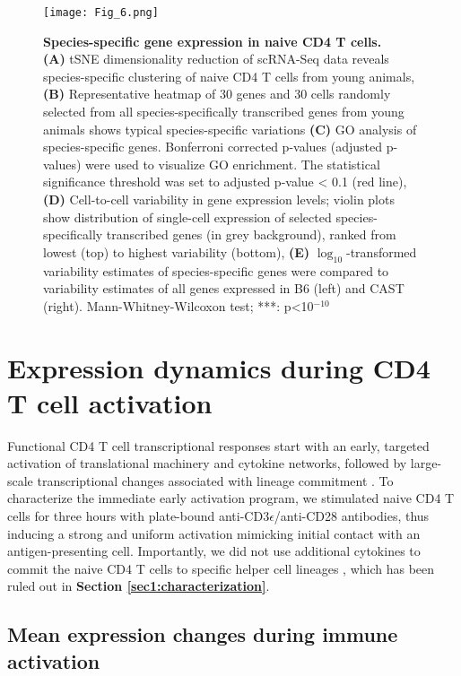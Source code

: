 \begin{figure}[!h]
\centering
\texttt{[image: Fig\_6.png]}
\caption[Species-specific gene expression in naive CD4\plus{} T cells]{\textbf{Species-specific gene expression in naive CD4\plus{} T cells.}\\
\textbf{(A)} tSNE dimensionality reduction of scRNA-Seq data reveals species-specific clustering of naive CD4\plus{} T cells from young animals, \textbf{(B)} Representative heatmap of 30 genes and 30 cells randomly selected from all species-specifically transcribed genes from young animals shows typical species-specific variations \textbf{(C)}  GO analysis of species-specific genes. Bonferroni corrected p-values (adjusted p-values) were used to visualize GO enrichment. The statistical significance threshold was set to adjusted p-value < 0.1 (red line), \textbf{(D)} Cell-to-cell variability in gene expression levels; violin plots show distribution of single-cell expression of selected species-specifically transcribed genes (in grey background), ranked from lowest (top) to highest variability (bottom), \textbf{(E)} $\log_10$-transformed variability estimates of species-specific genes were compared to variability estimates of all genes expressed in B6 (left) and CAST (right). Mann-Whitney-Wilcoxon test; ***: p<10$^{-10}$}
\label{fig1:species_specific}
\end{figure}

\newpage


\section{Expression dynamics during CD4\plus{} T cell activation}

Functional CD4\plus{} T cell transcriptional responses start with an early, targeted activation of translational machinery and cytokine networks, followed by large-scale transcriptional changes associated with lineage commitment \citep{Shay2013, Asmal2003}. To characterize the immediate early activation program, we stimulated naive CD4\plus{} T cells for three hours with plate-bound anti-CD3$\epsilon$/anti-CD28 antibodies, thus inducing a strong and uniform activation mimicking initial contact with an antigen-presenting cell. Importantly, we did not use additional cytokines to commit the naive CD4\plus{} T cells to specific helper cell lineages \citep{Zhu2010}, which has been ruled out in \textbf{Section \ref{sec1:characterization}}. 

\subsection{Mean expression changes during immune activation}

